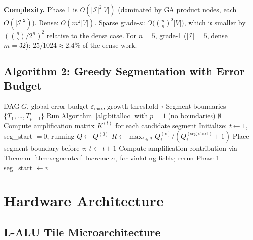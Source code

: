 \documentclass[11pt,a4paper]{article}
\theoremstyle{definition}
\theoremstyle{plain}
\theoremstyle{remark}
\begin{document}
\textbf{Complexity.}
Phase 1 is $O(|\mathcal{I}|^2 |V|)$ (dominated by GA product nodes,
each $O(|\mathcal{I}|^2)$).
Dense: $O(m^2|V|)$.
Sparse grade-$\kappa$:
$O\bigl(\binom{n}{\kappa}^2 |V|\bigr)$, which is smaller by
$(\binom{n}{\kappa}/2^n)^2$ relative to the dense case.
For $n=5$, grade-1 ($|\mathcal{I}|=5$, dense $m=32$):
$25/1024 \approx 2.4\%$ of the dense work.

\subsection{Algorithm 2: Greedy Segmentation with Error Budget}

\begin{algorithm}[H]
\caption{Greedy Segmentation with Error Budget}
\label{alg:segment}
\begin{algorithmic}[1]
\REQUIRE DAG $G$, global error budget $\varepsilon_{\max}$, growth threshold $\tau$
\ENSURE Segment boundaries $\{T_1,\ldots,T_{p-1}\}$
\STATE Run Algorithm~\ref{alg:bitalloc} with $p=1$ (no boundaries)
 \RETURN $\emptyset$ \ENDIF
\STATE Compute amplification matrix $K^{(t)}$ for each candidate segment
\STATE Initialize: $t \leftarrow 1$, seg\_start $= 0$, running $Q \leftarrow Q^{(0)}$
  \STATE $R \leftarrow \max_{i \in \mathcal{I}} Q_i^{(v)} / (Q_i^{(\text{seg\_start})} + 1)$
    \STATE Place segment boundary before $v$; $t \leftarrow t+1$
    \STATE Compute amplification contribution via Theorem~\ref{thm:segmented}
      \STATE Increase $\sigma_i$ for violating fields; rerun Phase 1
    \ENDIF
    \STATE seg\_start $\leftarrow v$
  \ENDIF
\ENDFOR
\end{algorithmic}
\end{algorithm}

\section{Hardware Architecture}
\label{sec:hw}

\subsection{L-ALU Tile Microarchitecture}
\end{document}

